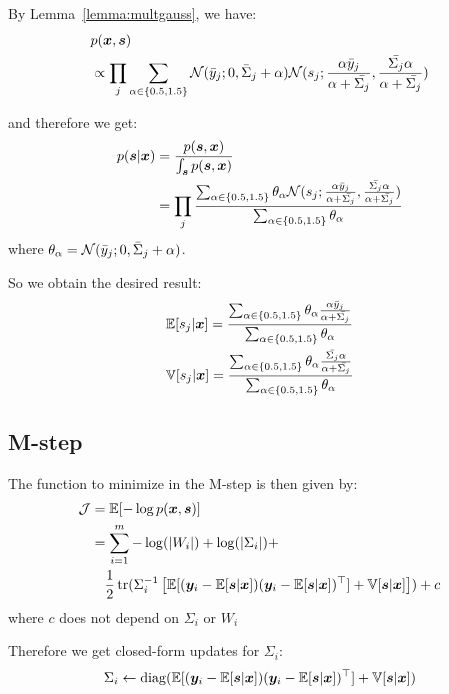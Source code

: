 By Lemma~\ref{lemma:multgauss}, we have:
\begin{align}
  &p(\boldsymbol{x}, \boldsymbol{s}) \\
  &\propto \prod_j \sum_{\alpha \in \{0.5, 1.5\}} \mathcal{N}(\bar{y}_{j}; 0 , \bar{\Sigma}_{j} + \alpha) \mathcal{N}(s_j; \frac{\alpha \bar{y}_{j}}{\alpha + \bar{\Sigma_{j}}}, \frac{\bar{\Sigma_{j}}\alpha}{\alpha + \bar{\Sigma_{j}}})
\end{align}

and therefore we get:
\begin{align}
  p(\boldsymbol{s} | \boldsymbol{x}) &= \frac{p(\boldsymbol{s}, \boldsymbol{x})}{\int_{\boldsymbol{s}} p(\boldsymbol{s}, \boldsymbol{x})} \\
                &= \prod_j \frac{\sum_{\alpha \in \{0.5, 1.5\}} \theta_{\alpha} \mathcal{N}(s_j; \frac{\alpha \bar{y}_{j}}{\alpha + \bar{\Sigma_{j}}}, \frac{\bar{\Sigma_{j}}\alpha}{\alpha + \bar{\Sigma_{j}}})}{\sum_{\alpha \in \{0.5, 1.5\}} \theta_{\alpha}}
\end{align}
where $\theta_{\alpha} = \mathcal{N}(\bar{y}_{j}; 0 , \bar{\Sigma}_{j} + \alpha)$.

So we obtain the desired result:
\begin{align}
  &\mathbb{E}[s_j | \boldsymbol{x}] = \frac{\sum_{\alpha \in \{0.5, 1.5\}} \theta_{\alpha} \frac{\alpha \bar{y}_{j}}{\alpha + \bar{\Sigma_{j}}}}{\sum_{\alpha \in \{0.5, 1.5\}} \theta_{\alpha}} \\
  & \mathbb{V}[s_j | \boldsymbol{x}] = \frac{\sum_{\alpha \in \{0.5, 1.5\}} \theta_{\alpha} \frac{\bar{\Sigma_{j}}\alpha}{\alpha + \bar{\Sigma_{j}}}}{\sum_{\alpha \in \{0.5, 1.5\}} \theta_{\alpha}}  
\end{align}

\subsection{M-step}
The function to minimize in the M-step is then given by:
\begin{align}
  \mathcal{J} &= \mathbb{E}[-\log p(\boldsymbol{x}, \boldsymbol{s})] \\
  &= \sum_{i=1}^m - \log(|W_i|) + \log(|\Sigma_i|) + \\& \enspace \enspace \frac12 \mathop{\mathrm{tr}}(\Sigma_i^{-1} \left[\mathbb{E}[(\boldsymbol{y}_i - \mathbb{E}[\boldsymbol{s} | \boldsymbol{x}]) (\boldsymbol{y}_i - \mathbb{E}[\boldsymbol{s} | \boldsymbol{x}])^{\top}]+ \mathbb{V}[\boldsymbol{s} | \boldsymbol{x}]\right]) + c
\end{align}
where $c$ does not depend on $\Sigma_i$ or $W_i$

Therefore we get closed-form updates for $\Sigma_i$: 
\begin{align}
\Sigma_i \leftarrow  \operatorname*{diag}(\mathbb{E}[(\boldsymbol{y}_i - \mathbb{E}[\boldsymbol{s} | \boldsymbol{x}]) (\boldsymbol{y}_i - \mathbb{E}[\boldsymbol{s} | \boldsymbol{x}])^{\top}]+ \mathbb{V}[\boldsymbol{s} | \boldsymbol{x}])
\end{align}


